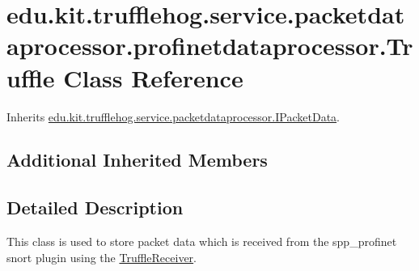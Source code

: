 \hypertarget{classedu_1_1kit_1_1trufflehog_1_1service_1_1packetdataprocessor_1_1profinetdataprocessor_1_1_truffle}{}\section{edu.\+kit.\+trufflehog.\+service.\+packetdataprocessor.\+profinetdataprocessor.\+Truffle Class Reference}
\label{classedu_1_1kit_1_1trufflehog_1_1service_1_1packetdataprocessor_1_1profinetdataprocessor_1_1_truffle}


Inherits \hyperlink{interfaceedu_1_1kit_1_1trufflehog_1_1service_1_1packetdataprocessor_1_1_i_packet_data}{edu.\+kit.\+trufflehog.\+service.\+packetdataprocessor.\+I\+Packet\+Data}.

\subsection*{Additional Inherited Members}


\subsection{Detailed Description}
This class is used to store packet data which is received from the spp\+\_\+profinet snort plugin using the \hyperlink{classedu_1_1kit_1_1trufflehog_1_1service_1_1packetdataprocessor_1_1profinetdataprocessor_1_1_truffle_receiver}{Truffle\+Receiver}. 